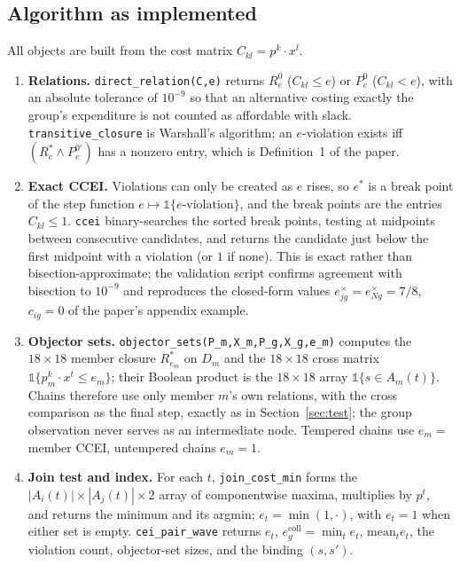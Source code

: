 \documentclass[11pt]{article}
\theoremstyle{remark}
\begin{document}
\subsection{Algorithm as implemented}

All objects are built from the cost matrix $C_{kl}=p^k\cdot x^l$.
\begin{enumerate}[leftmargin=1.6em]
\item \textbf{Relations.} \texttt{direct\_relation(C,e)} returns $R^0_e$ ($C_{kl}\le e$) or $P^0_e$ ($C_{kl}<e$), with an absolute tolerance of $10^{-9}$ so that an alternative costing exactly the group's expenditure is not counted as affordable with slack. \texttt{transitive\_closure} is Warshall's algorithm; an $e$-violation exists iff $(R^*_e\wedge P^{0\prime}_e)$ has a nonzero entry, which is Definition~1 of the paper.
\item \textbf{Exact CCEI.} Violations can only be created as $e$ rises, so $e^*$ is a break point of the step function $e\mapsto\mathbb{1}\{\text{$e$-violation}\}$, and the break points are the entries $C_{kl}\le 1$. \texttt{ccei} binary-searches the sorted break points, testing at midpoints between consecutive candidates, and returns the candidate just below the first midpoint with a violation (or $1$ if none). This is exact rather than bisection-approximate; the validation script confirms agreement with bisection to $10^{-9}$ and reproduces the closed-form values $e^{\times}_{jg}=e^{\times}_{Ng}=7/8$, $c_{ig}=0$ of the paper's appendix example.
\item \textbf{Objector sets.} \texttt{objector\_sets(P\_m,X\_m,P\_g,X\_g,e\_m)} computes the $18\times 18$ member closure $R^*_{e_m}$ on $D_m$ and the $18\times 18$ cross matrix $\mathbb{1}\{p^k_m\cdot x^t\le e_m\}$; their Boolean product is the $18\times 18$ array $\mathbb{1}\{s\in A_m(t)\}$. Chains therefore use only member $m$'s own relations, with the cross comparison as the final step, exactly as in Section~\ref{sec:test}; the group observation never serves as an intermediate node. Tempered chains use $e_m=$ member CCEI, untempered chains $e_m=1$.
\item \textbf{Join test and index.} For each $t$, \texttt{join\_cost\_min} forms the $|A_i(t)|\times|A_j(t)|\times 2$ array of componentwise maxima, multiplies by $p^t$, and returns the minimum and its argmin; $e_t=\min(1,\cdot)$, with $e_t=1$ when either set is empty. \texttt{cei\_pair\_wave} returns $e_t$, $e^{\mathrm{coll}}_g=\min_t e_t$, $\mathrm{mean}_t e_t$, the violation count, objector-set sizes, and the binding $(s,s')$.

\end{enumerate}
\end{document}
